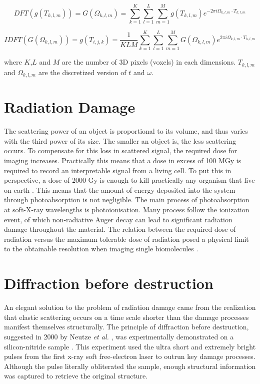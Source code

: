 \begin{enumerate}
\begin{equation}
DFT( g( T_{k,l,m} ) ) = G( \Omega_{k,l,m} ) = \sum_{k=1}^{K} \sum_{l=1}^{L} \sum_{m=1}^{M} g( T_{k,l,m} ) e^{-2 \pi i \Omega_{k,l,m} \cdot T_{k,l,m}}
\end{equation}

\begin{equation}
IDFT( G( \Omega_{k,l,m} ) ) = g ( T_{i,j,k} ) = \frac{1}{{K L M}} \sum_{k=1}^{K} \sum_{l=1}^{L}\sum_{m=1}^{M} G( \Omega_{k,l,m} ) e^{2 \pi i \Omega_{k,l,m} \cdot T_{k,l,m} }
\end{equation}

where $K$,$L$ and $M$ are the number of 3D pixels (voxels) in each dimensions. $T_{k,l,m}$ and $\Omega_{k,l,m}$ are the discretized version of $t$ and $\omega$. 

\end{enumerate}

\section{Radiation Damage}
The scattering power of an object is proportional to its volume, and thus varies with the third power of its size. The smaller an object is, the less scattering occurs. To compensate for this loss in scattered signal, the required dose for imaging increases. Practically this means that a dose in excess of 100 MGy is required to record an interpretable signal from a living cell. To put this in perspective, a dose of 2000 Gy is enough to kill practically any organism that live on earth \cite{Fairand2002,Game2005}. This means that the amount of energy deposited into the system through photoabsorption is not negligible. The main process of photoabsorption at soft-X-ray wavelengths is  photoionisation. Many process follow the ionization event, of which non-radiative Auger decay can lead to significant radiation damage throughout the material. The relation between the required dose of radiation versus the maximum tolerable dose of radiation posed a physical limit to the obtainable resolution when imaging single biomolecules \cite{Howells2009}.

\section{Diffraction before destruction}
An elegant solution to the problem of radiation damage came from the realization that elastic scattering occurs on a  time scale shorter than the damage processes manifest themselves structurally. The principle of diffraction before destruction, suggested in 2000 by Neutze \textit{et al.} \cite{Neutze2000}, was experimentally demonstrated on a silicon-nitride sample \cite{Chapman2006}. This experiment used the ultra short and extremely bright pulses from the first x-ray soft free-electron laser to outrun key damage processes. Although the pulse literally obliterated the sample, enough structural information was captured to retrieve the original structure. 

